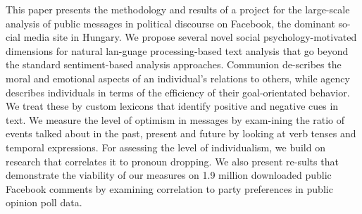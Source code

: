 This paper presents the methodology and results of a project for the large-scale analysis of public messages in political discourse on Facebook, the dominant so-cial media site in Hungary. We propose several novel social psychology-motivated dimensions for natural lan-guage processing-based text analysis that go beyond the standard sentiment-based analysis approaches. Communion de-scribes the moral and emotional aspects of an individual's relations to others, while agency describes individuals in terms of the efficiency of their goal-orientated behavior. We treat these by custom lexicons that identify positive and negative cues in text. We measure the level of optimism in messages by exam-ining the ratio of events talked about in the past, present and future by looking at verb tenses and temporal expressions. For assessing the level of individualism, we build on research that correlates it to pronoun dropping. We also present re-sults that demonstrate the viability of our measures on 1.9 million downloaded public Facebook comments by examining correlation to party preferences in public opinion poll data.
